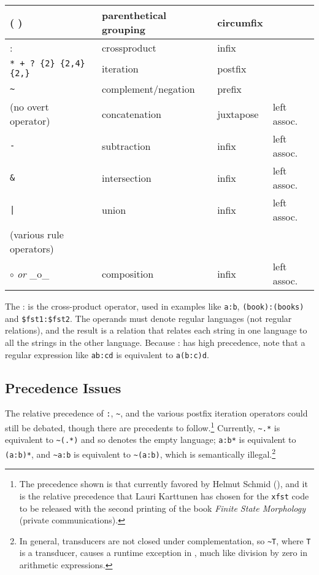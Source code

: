 \noindent
\begin{tabular}{|l|l|l|l|}
\hline
( ) &  parenthetical grouping & circumfix &\\
\hline
: & crossproduct & infix &\\
\hline
\verb!* + ? {2} {2,4} {2,}! & iteration & postfix &\\
\hline
\verb!~!  & complement/negation & prefix & \\
\hline
(no overt operator) & concatenation & juxtapose & left assoc.\\
\hline
\verb!-! & subtraction  & infix & left assoc.\\
\hline
\verb!&! & intersection & infix & left assoc.\\
\hline
\verb!|! & union        & infix & left assoc.\\
\hline
(various rule operators) & & &\\
\hline
$\circ$ \emph{or} \_o\_  & composition & infix & left assoc.\\
\hline
\end{tabular}

\vspace{0.5cm}
The : is the cross-product operator, used in examples like \texttt{a:b},
\texttt{(book):(books)} and \verb!$fst1:$fst2!.  The operands must
denote regular languages (not regular relations), and the result is a
relation that relates each string in one language to all the strings in
the other language.  Because : has high precedence, note that a regular
expression like \texttt{ab:cd} is equivalent to \texttt{a(b:c)d}.



\subsection{Precedence Issues}
 
The relative precedence of  \verb!:!, \verb!~!, and the various postfix
iteration operators could still be debated, though
there are precedents to follow.\footnote{The precedence shown is
that currently favored by Helmut Schmid (), and it is the relative precedence that Lauri Karttunen
has chosen for the  \texttt{xfst} code to be released with the second printing of
the book \emph{Finite State Morphology} (private communications).}
Currently, \verb!~.*! is
equivalent to \verb!~(.*)! and so denotes the empty language; \verb!a:b*!
is equivalent to \verb!(a:b)*!, and \verb!~a:b! is equivalent to
\verb!~(a:b)!, which is semantically illegal.\footnote{In general, transducers are not closed under
complementation, so \texttt{\~{}T}, where \texttt{T} is a transducer, causes a
runtime exception in \Kleene{}, much like division by zero in
arithmetic expressions.}

